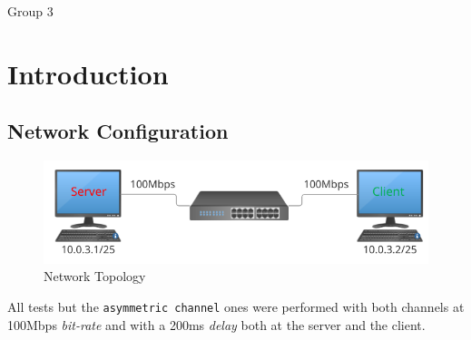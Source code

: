 \documentclass{exam}
\begin{document}
\newcommand{\LoggaEng}{
	\textsc{\Huge Uppsala University}\\[0.7cm]
	\texttt{[image: Uppsala\_University\_seal\_svg.png]}\\[0.5cm]
}

\begin{titlepage}

	\center


	\LoggaSwe


	\Large Group 3\\

	\vfill

\end{titlepage}
\pagebreak

\section{Introduction}
\subsection{Network Configuration}
\begin{figure}[H]
    \centering
    \includegraphics[width=0.70\linewidth]{network_topology.png}
    \caption{Network Topology}
    \label{fig:enter-label}
\end{figure}

All tests but the \verb|asymmetric channel| ones were performed with both channels at 100Mbps \textit{bit-rate} and with a 200ms \textit{delay} both at the server and the client.
\end{document}
